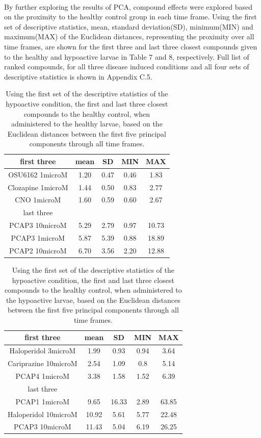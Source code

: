 \documentclass[a4paper,12pt]{article}
\begin{document}
\\By further exploring the results of PCA, compound effects were explored based on the proximity to the healthy control group in each time frame. Using the first set of descriptive statistics, mean, standard deviation(SD), minimum(MIN) and maximum(MAX) of the Euclidean distances, representing the proximity over all time frames, are shown for the first three and last three closest compounds given to the healthy and hypoactive larvae in Table 7 and 8, respectively. Full list of ranked compounds, for all three disease induced conditions and all four sets of descriptive statistics is shown in Appendix C.5.
\begin{table}[h!]\tiny
\centering
\begin{tabular}{|c|c|c|c|c|}
\hline
first three          & mean & SD   & MIN  & MAX   \\ \hline
OSU6162 1microM       & 1.20  & 0.47 & 0.46 & 1.83  \\ \hline
Clozapine 1microM     & 1.44 & 0.50  & 0.83 & 2.77  \\ \hline
CNO 1microM           & 1.60  & 0.59 & 0.60  & 2.67  \\ \hline
last three           & \multicolumn{4}{c|}{}      \\ \hline
PCAP3 10microM      & 5.29 & 2.79 & 0.97 & 10.73 \\ \hline
PCAP3 1microM       & 5.87 & 5.39 & 0.88 & 18.89 \\ \hline
PCAP2 10microM        & 6.70  & 3.56 & 2.20  & 12.88 \\ \hline
\end{tabular}
\caption{Using the first set of the descriptive statistics of the hypoactive condition, the first and last three closest compounds to the healthy control, when administered to the healthy larvae, based on the Euclidean distances between the first five principal components through all time frames.}
\end{table}
\newpage
\begin{table}[h!]\tiny
\centering
\begin{tabular}{|c|c|c|c|c|}
\hline
first three           & mean & SD   & MIN  & MAX   \\ \hline
Haloperidol 3microM   & 1.99  & 0.93  & 0.94 & 3.64  \\ \hline
Cariprazine 10microM  & 2.54  & 1.09  & 0.8  & 5.14  \\ \hline
PCAP4 1microM       & 3.38  & 1.58  & 1.52 & 6.39  \\ \hline
last three            & \multicolumn{4}{c|}{}      \\ \hline
PCAP1 1microM         & 9.65  & 16.33 & 2.89 & 63.85 \\ \hline
Haloperidol 10microM  & 10.92 & 5.61  & 5.77 & 22.48 \\ \hline
PCAP3 10microM      & 11.43 & 5.04  & 6.19 & 26.25 \\ \hline
\end{tabular}
\caption{Using the first set of the descriptive statistics of the hypoactive condition, the first and last three closest compounds to the healthy control, when administered to the hypoactive larvae, based on the Euclidean distances between the first five principal components through all time frames.}
\end{table}
\end{document}
